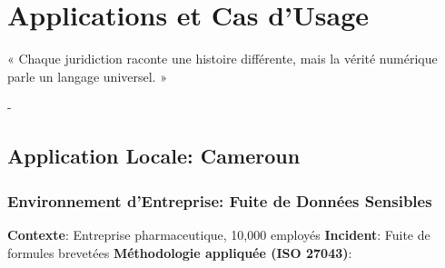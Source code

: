 \chapter{Applications et Cas d'Usage}

\epigraph{« Chaque juridiction raconte une histoire différente, mais la vérité numérique parle un langage universel. »}{-\hfill \textit{}}

\section{Application Locale: Cameroun}
    \subsection{Environnement d'Entreprise: Fuite de Données Sensibles}
        \textbf{Contexte}: Entreprise pharmaceutique, 10,000 employés
        \textbf{Incident}: Fuite de formules brevetées
        \textbf{Méthodologie appliquée (ISO 27043)}:

